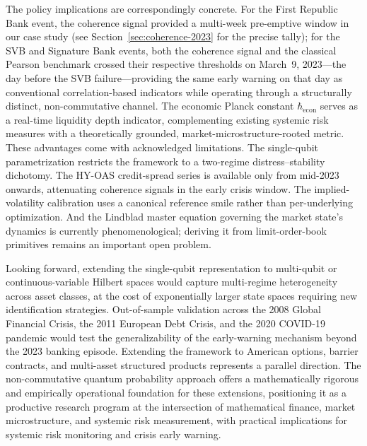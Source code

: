 The policy implications are correspondingly concrete. For the First Republic
Bank event, the coherence signal provided a multi-week pre-emptive window in
our case study (see Section~\ref{sec:coherence-2023} for the precise tally);
for the SVB and Signature Bank events, both the coherence signal and the
classical Pearson benchmark crossed their respective thresholds on March~9,
2023---the day before the SVB failure---providing the same early warning on
that day as conventional correlation-based indicators while operating through
a structurally distinct, non-commutative channel. The economic Planck
constant $\hbar_{\mathrm{econ}}$ serves as a real-time liquidity depth indicator,
complementing existing systemic risk measures with a theoretically grounded,
market-microstructure-rooted metric. These advantages come with acknowledged
limitations. The single-qubit parametrization restricts the framework to a
two-regime distress--stability dichotomy. The HY-OAS credit-spread series is
available only from mid-2023 onwards, attenuating coherence signals in the early
crisis window. The implied-volatility calibration uses a canonical reference
smile rather than per-underlying optimization. And the Lindblad master equation
governing the market state's dynamics is currently phenomenological; deriving it
from limit-order-book primitives remains an important open problem.

Looking forward, extending the single-qubit representation to multi-qubit or
continuous-variable Hilbert spaces would capture multi-regime heterogeneity
across asset classes, at the cost of exponentially larger state spaces requiring
new identification strategies. Out-of-sample validation across the 2008 Global
Financial Crisis, the 2011 European Debt Crisis, and the 2020 COVID-19 pandemic
would test the generalizability of the early-warning mechanism beyond the 2023
banking episode. Extending the framework to American options, barrier contracts,
and multi-asset structured products represents a parallel direction. The
non-commutative quantum probability approach offers a mathematically rigorous and
empirically operational foundation for these extensions, positioning it as a
productive research program at the intersection of mathematical finance, market
microstructure, and systemic risk measurement, with practical implications for
systemic risk monitoring and crisis early warning.
